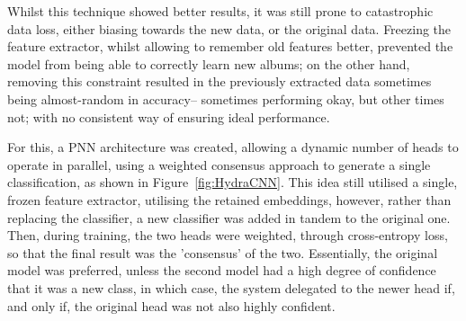                 Whilst this technique showed better results, it was still prone to catastrophic data loss, either biasing towards the new data, or the original data. Freezing the feature extractor, whilst allowing to remember old features better, prevented the model from being able to correctly learn new albums; on the other hand, removing this constraint resulted in the previously extracted data sometimes being almost-random in accuracy-- sometimes performing okay, but other times not; with no consistent way of ensuring ideal performance.
    
                For this, a PNN architecture was created, allowing a dynamic number of heads to operate in parallel, using a weighted consensus approach to generate a single classification, as shown in Figure~\ref{fig:HydraCNN}. This idea still utilised a single, frozen feature extractor, utilising the retained embeddings, however, rather than replacing the classifier, a new classifier was added in tandem to the original one. Then, during training, the two heads were weighted, through cross-entropy loss, so that the final result was the 'consensus' of the two. Essentially, the original model was preferred, unless the second model had a high degree of confidence that it was a new class, in which case, the system delegated to the newer head if, and only if, the original head was not also highly confident.
    
